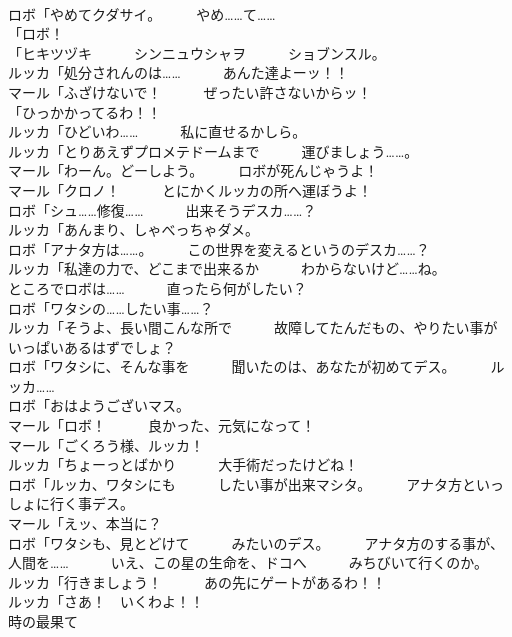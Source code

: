 \documentclass[8pt]{extreport}
\begin{document}
\begin{CJK}{UTF8}{min}
\\	ロボ「やめてクダサイ。　　　やめ……て……	
\\	「ロボ！	
\\	「ヒキツヅキ　　　シンニュウシャヲ　　　ショブンスル。	
\\	ルッカ「処分されんのは……　　　あんた達よーッ！！	
\\	マール「ふざけないで！　　　ぜったい許さないからッ！	
\\	「ひっかかってるわ！！	
\\	ルッカ「ひどいわ……　　　私に直せるかしら。	
\\	ルッカ「とりあえずプロメテドームまで　　　運びましょう……。	
\\	マール「わーん。どーしよう。　　　ロボが死んじゃうよ！	
\\	マール「クロノ！　　　とにかくルッカの所へ運ぼうよ！	
\\	ロボ「シュ……修復……　　　出来そうデスカ……？	
\\	ルッカ「あんまり、しゃべっちゃダメ。	
\\	ロボ「アナタ方は……。　　　この世界を変えるというのデスカ……？	
\\	ルッカ「私達の力で、どこまで出来るか　　　わからないけど……ね。	
\\	ところでロボは……　　　直ったら何がしたい？	
\\	ロボ「ワタシの……したい事……？	
\\	ルッカ「そうよ、長い間こんな所で　　　故障してたんだもの、やりたい事が　　　いっぱいあるはずでしょ？	
\\	ロボ「ワタシに、そんな事を　　　聞いたのは、あなたが初めてデス。　　　ルッカ……	
\\	ロボ「おはようございマス。	
\\	マール「ロボ！　　　良かった、元気になって！	
\\	マール「ごくろう様、ルッカ！	
\\	ルッカ「ちょーっとばかり　　　大手術だったけどね！	
\\	ロボ「ルッカ、ワタシにも　　　したい事が出来マシタ。　　　アナタ方といっしょに行く事デス。	
\\	マール「えッ、本当に？	
\\	ロボ「ワタシも、見とどけて　　　みたいのデス。　　　アナタ方のする事が、人間を……　　　いえ、この星の生命を、ドコへ　　　みちびいて行くのか。	
\\	ルッカ「行きましょう！　　　あの先にゲートがあるわ！！	
\\	ルッカ「さあ！　いくわよ！！	
\\	時の最果て	

\end{CJK}
\end{document}

